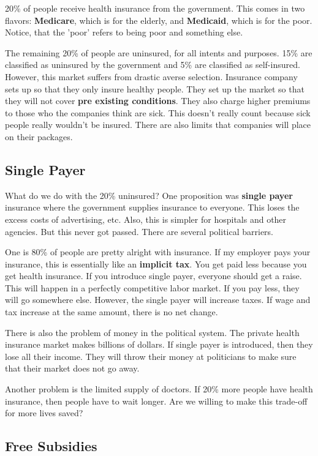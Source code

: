 \documentclass{article}
\begin{document}
20\% of people receive health insurance from the government. This comes in two
flavors: \textbf{Medicare}, which is for the elderly, and \textbf{Medicaid},
which is for the poor. Notice, that the 'poor' refers to being poor and
something else.

The remaining 20\% of people are uninsured, for all intents and purposes. 15\%
are classified as uninsured by the government and 5\% are classified as
self-insured. However, this market suffers from drastic averse selection.
Insurance company sets up so that they only insure healthy people. They set up
the market so that they will not cover \textbf{pre existing conditions}. They
also charge higher premiums to those who the companies think are sick. This
doesn't really count because sick people really wouldn't be insured. There are
also limits that companies will place on their packages.

\subsection{Single Payer}

What do we do with the 20\% uninsured? One proposition was \textbf{single payer}
insurance where the government supplies insurance to everyone. This loses the
excess costs of advertising, etc. Also, this is simpler for hospitals and other
agencies. But this never got passed. There are several political barriers.

One is 80\% of people are pretty alright with insurance. If my employer pays
your insurance, this is essentially like an \textbf{implicit tax}. You get paid
less because you get health insurance. If you introduce single payer, everyone
should get a raise. This will happen in a perfectly competitive labor market. If
you pay less, they will go somewhere else. However, the single payer will
increase taxes. If wage and tax increase at the same amount, there is no net
change.

There is also the problem of money in the political system. The private health
insurance market makes billions of dollars. If single payer is introduced, then
they lose all their income. They will throw their money at politicians to make
sure that their market does not go away.

Another problem is the limited supply of doctors. If 20\% more people have
health insurance, then people have to wait longer. Are we willing to make this
trade-off for more lives saved?

\subsection{Free Subsidies}
\end{document}
